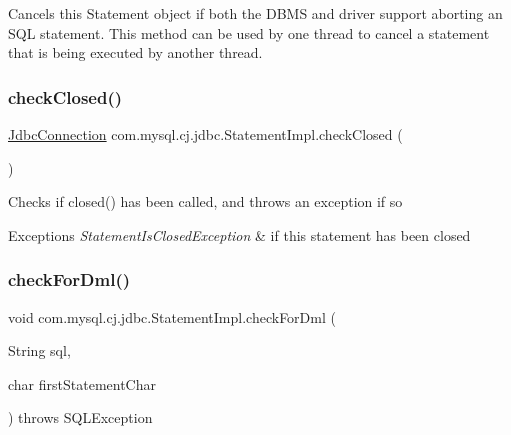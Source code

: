 Cancels this Statement object if both the D\+B\+MS and driver support aborting an S\+QL statement. This method can be used by one thread to cancel a statement that is being executed by another thread. \mbox{\label{classcom_1_1mysql_1_1cj_1_1jdbc_1_1_statement_impl_abd738a18f0109b2305a642025eb4a3bb}} 
\subsubsection{\texorpdfstring{check\+Closed()}{checkClosed()}}
{\footnotesize\ttfamily \mbox{\hyperlink{interfacecom_1_1mysql_1_1cj_1_1jdbc_1_1_jdbc_connection}{Jdbc\+Connection}} com.\+mysql.\+cj.\+jdbc.\+Statement\+Impl.\+check\+Closed (\begin{DoxyParamCaption}{ }\end{DoxyParamCaption})\hspace{0.3cm}{\ttfamily [protected]}}

Checks if closed() has been called, and throws an exception if so


\begin{DoxyExceptions}{Exceptions}
{\em Statement\+Is\+Closed\+Exception} & if this statement has been closed \\
\hline
\end{DoxyExceptions}
\mbox{\label{classcom_1_1mysql_1_1cj_1_1jdbc_1_1_statement_impl_a153a70521a7a239c1d6ad089f474d7ba}} 
\subsubsection{\texorpdfstring{check\+For\+Dml()}{checkForDml()}}
{\footnotesize\ttfamily void com.\+mysql.\+cj.\+jdbc.\+Statement\+Impl.\+check\+For\+Dml (\begin{DoxyParamCaption}\item[{String}]{sql,  }\item[{char}]{first\+Statement\+Char }\end{DoxyParamCaption}) throws S\+Q\+L\+Exception\hspace{0.3cm}{\ttfamily [protected]}}

